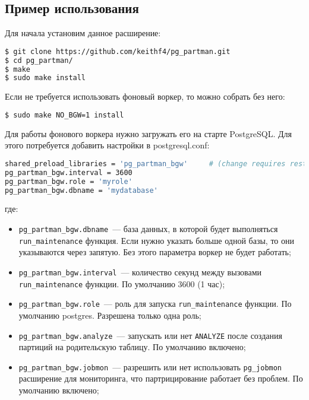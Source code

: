 \subsection{Пример использования}

Для начала установим данное расширение:

\begin{lstlisting}[language=Bash,label=lst:pgpartman1,caption=Установка]
$ git clone https://github.com/keithf4/pg_partman.git
$ cd pg_partman/
$ make
$ sudo make install
\end{lstlisting}

Если не требуется использовать фоновый воркер, то можно собрать без него:

\begin{lstlisting}[language=Bash,label=lst:pgpartman2,caption=Установка]
$ sudo make NO_BGW=1 install
\end{lstlisting}

Для работы фонового воркера нужно загружать его на старте PostgreSQL. Для этого потребуется добавить настройки в postgresql.conf:

\begin{lstlisting}[language=Bash,label=lst:pgpartman3,caption=Настройки воркера]
shared_preload_libraries = 'pg_partman_bgw'     # (change requires restart)
pg_partman_bgw.interval = 3600
pg_partman_bgw.role = 'myrole'
pg_partman_bgw.dbname = 'mydatabase'
\end{lstlisting}

где:

\begin{itemize}
  \item \lstinline!pg_partman_bgw.dbname!~--- база данных, в которой будет выполняться \lstinline!run_maintenance! функция. Если нужно указать больше одной базы, то они указываются через запятую. Без этого параметра воркер не будет работать;
  \item \lstinline!pg_partman_bgw.interval!~--- количество секунд между вызовами \lstinline!run_maintenance! функции. По умолчанию 3600 (1 час);
  \item \lstinline!pg_partman_bgw.role!~--- роль для запуска \lstinline!run_maintenance! функции. По умолчанию postgres. Разрешена только одна роль;
  \item \lstinline!pg_partman_bgw.analyze!~--- запускать или нет \lstinline!ANALYZE! после создания партиций на родительскую таблицу. По умолчанию включено;
  \item \lstinline!pg_partman_bgw.jobmon!~--- разрешить или нет использовать \lstinline!pg_jobmon! расширение для мониторинга, что партрицирование работает без проблем. По умолчанию включено;
\end{itemize}

